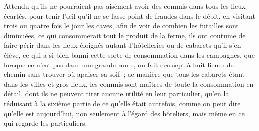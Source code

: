 \documentclass[french,twoside]{book} %
\begin{document}
Attendu qu’ils ne pourraient pas aisément avoir des commis dans tous les lieux écartés, pour tenir l’œil qu’il ne se fasse point de fraudes dans le débit, en visitant trois ou quatre fois le jour les caves, afin de voir de combien les futailles sont diminuées, ce qui consommerait tout le produit de la ferme, ils ont coutume de faire périr dans les lieux éloignés autant d’hôtelleries ou de cabarets qu’il s’en élève, ce qui a si bien banni cette sorte de consommation dans les campagnes, que lorsque ce n’est pas dans une grande route, on fait des sept à huit lieues de chemin sans trouver où apaiser sa soif ; de manière que tous les cabarets étant dans les villes et gros lieux, les commis sont maîtres de toute la consommation en détail, dont ils ne peuvent tirer aucune utilité en leur particulier, qu’en la réduisant à la sixième partie de ce qu’elle était autrefois, comme on peut dire qu’elle est aujourd’hui, non seulement à l’égard des hôteliers, mais même en ce qui regarde les particuliers.\par
\end{document}
